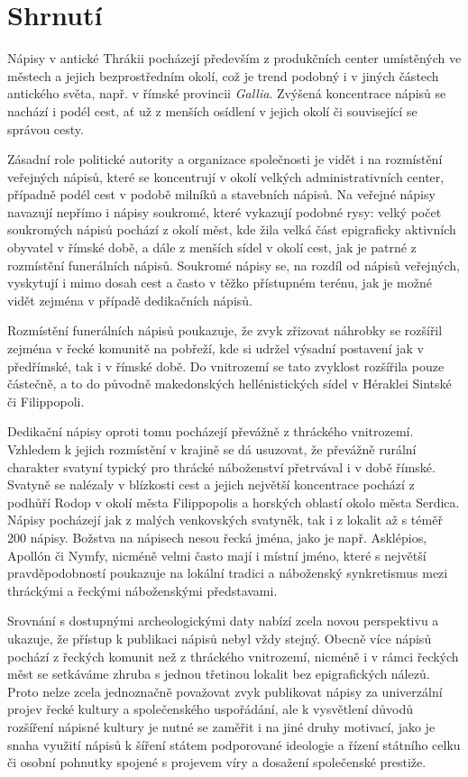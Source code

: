 \section[shrnutí-25]{Shrnutí}

Nápisy v antické Thrákii pocházejí především z produkčních center umístěných ve městech a jejich bezprostředním okolí, což je trend podobný i v jiných částech antického světa, např. v římské provincii {\em Gallia}. Zvýšená koncentrace nápisů se nachází i podél cest, ať už z menších osídlení v jejich okolí či související se správou cesty.

Zásadní role politické autority a organizace společnosti je vidět i na rozmístění veřejných nápisů, které se koncentrují v okolí velkých administrativních center, případně podél cest v podobě milníků a stavebních nápisů. Na veřejné nápisy navazují nepřímo i nápisy soukromé, které vykazují podobné rysy: velký počet soukromých nápisů pochází z okolí měst, kde žila velká část epigraficky aktivních obyvatel v římské době, a dále z menších sídel v okolí cest, jak je patrné z rozmístění funerálních nápisů. Soukromé nápisy se, na rozdíl od nápisů veřejných, vyskytují i mimo dosah cest a často v těžko přístupném terénu, jak je možné vidět zejména v případě dedikačních nápisů.

Rozmístění funerálních nápisů poukazuje, že zvyk zřizovat náhrobky se rozšířil zejména v řecké komunitě na pobřeží, kde si udržel výsadní postavení jak v předřímské, tak i v římské době. Do vnitrozemí se tato zvyklost rozšířila pouze částečně, a to do původně makedonských hellénistických sídel v Héraklei Sintské či Filippopoli.

Dedikační nápisy oproti tomu pocházejí převážně z thráckého vnitrozemí. Vzhledem k jejich rozmístění v krajině se dá usuzovat, že převážně rurální charakter svatyní typický pro thrácké náboženství přetrvával i v době římské. Svatyně se nalézaly v blízkosti cest a jejich největší koncentrace pochází z podhůří Rodop v okolí města Filippopolis a horských oblastí okolo města Serdica. Nápisy pocházejí jak z malých venkovských svatyněk, tak i z lokalit až s téměř 200 nápisy. Božstva na nápisech nesou řecká jména, jako je např. Asklépios, Apollón či Nymfy, nicméně velmi často mají i místní jméno, které s největší pravděpodobností poukazuje na lokální tradici a náboženský synkretismus mezi thráckými a řeckými náboženskými představami.

Srovnání s dostupnými archeologickými daty nabízí zcela novou perspektivu a ukazuje, že přístup k publikaci nápisů nebyl vždy stejný. Obecně více nápisů pochází z řeckých komunit než z thráckého vnitrozemí, nicméně i v rámci řeckých měst se setkáváme zhruba s jednou třetinou lokalit bez epigrafických nálezů. Proto nelze zcela jednoznačně považovat zvyk publikovat nápisy za univerzální projev řecké kultury a společenského uspořádání, ale k vysvětlení důvodů rozšíření nápisné kultury je nutné se zaměřit i na jiné druhy motivací, jako je snaha využití nápisů k šíření státem podporované ideologie a řízení státního celku či osobní pohnutky spojené s projevem víry a dosažení společenské prestiže.

